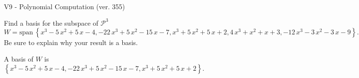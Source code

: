 \begin{exercise}
  \begin{exerciseTitle}V9 - Polynomial Computation (ver. 355)\end{exerciseTitle}
  \begin{exerciseStatement}
    Find a basis for the subspace of \(\mathcal{P}^3\) 
\[W=\mathrm{span}\ \left\{x^{3} - 5 \, x^{2} + 5 \, x - 4 , -22 \, x^{3} + 5 \, x^{2} - 15 \, x - 7 , x^{3} + 5 \, x^{2} + 5 \, x + 2 , 4 \, x^{3} + x^{2} + x + 3 , -12 \, x^{3} - 3 \, x^{2} - 3 \, x - 9\right\}.\]
 Be sure to explain why your result is a basis.


  \end{exerciseStatement}
  \begin{exerciseAnswer}
   A basis of \(W\) is  \(\left\{x^{3} - 5 \, x^{2} + 5 \, x - 4 , -22 \, x^{3} + 5 \, x^{2} - 15 \, x - 7 , x^{3} + 5 \, x^{2} + 5 \, x + 2\right\}\).
  


  \end{exerciseAnswer}
\end{exercise}
